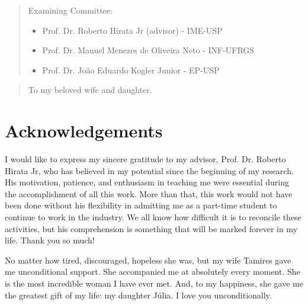 \documentclass[12pt,twoside,a4paper]{book}
\theoremstyle{plain}
\theoremstyle{definition}
\newenvironment{dedication}
     {\vspace{6ex}\begin{quotation}\begin{center}\begin{em}}
     {\par\end{em}\end{center}\end{quotation}}
\begin{document}
    \begin{quote}
    \noindent Examining Committee:
    
    \begin{itemize}
 		\item Prof. Dr. Roberto Hirata Jr (advisor) - IME-USP
 		\item Prof. Dr. Manuel Menezes de Oliveira Neto - INF-UFRGS
 		\item Prof. Dr. João Eduardo Kogler Junior - EP-USP
    \end{itemize}
      
    \end{quote}
\pagebreak

\begin{dedication}
\vspace*{20cm}
\begin{flushright}
To my beloved wife and daughter.
\end{flushright}
\end{dedication}


\chapter*{Acknowledgements}
I would like to express my sincere gratitude to my advisor, Prof. Dr. Roberto Hirata Jr, who has believed in my potential since the beginning of my research. His motivation, patience, and enthusiasm in teaching me were essential during the accomplishment of all this work. More than that, this work would not have been done without his flexibility in admitting me as a part-time student to continue to work in the industry. We all know how difficult it is to reconcile these activities, but his comprehension is something that will be marked forever in my life. Thank you so much!

No matter how tired, discouraged, hopeless she was, but my wife Tamires gave me unconditional support. She accompanied me at absolutely every moment. She is the most incredible woman I have ever met. And, to my happiness, she gave me the greatest gift of my life: my daughter Júlia. I love you unconditionally.
\end{document}
